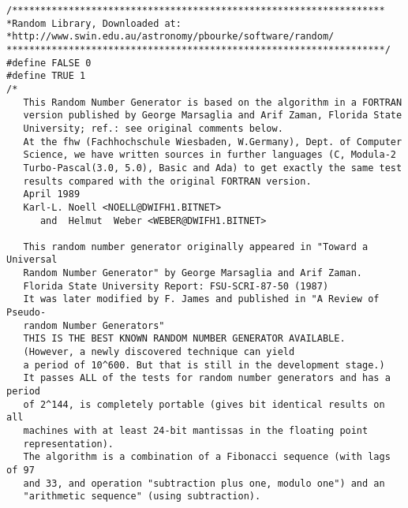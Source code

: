 \noindent
  \begin{lstlisting}[style=C]
/******************************************************************
*Random Library, Downloaded at:
*http://www.swin.edu.au/astronomy/pbourke/software/random/
*******************************************************************/
#define FALSE 0
#define TRUE 1
/*
   This Random Number Generator is based on the algorithm in a FORTRAN
   version published by George Marsaglia and Arif Zaman, Florida State
   University; ref.: see original comments below.
   At the fhw (Fachhochschule Wiesbaden, W.Germany), Dept. of Computer
   Science, we have written sources in further languages (C, Modula-2
   Turbo-Pascal(3.0, 5.0), Basic and Ada) to get exactly the same test
   results compared with the original FORTRAN version.
   April 1989
   Karl-L. Noell <NOELL@DWIFH1.BITNET>
      and  Helmut  Weber <WEBER@DWIFH1.BITNET>

   This random number generator originally appeared in "Toward a Universal
   Random Number Generator" by George Marsaglia and Arif Zaman.
   Florida State University Report: FSU-SCRI-87-50 (1987)
   It was later modified by F. James and published in "A Review of Pseudo-
   random Number Generators"
   THIS IS THE BEST KNOWN RANDOM NUMBER GENERATOR AVAILABLE.
   (However, a newly discovered technique can yield
   a period of 10^600. But that is still in the development stage.)
   It passes ALL of the tests for random number generators and has a period
   of 2^144, is completely portable (gives bit identical results on all
   machines with at least 24-bit mantissas in the floating point
   representation).
   The algorithm is a combination of a Fibonacci sequence (with lags of 97
   and 33, and operation "subtraction plus one, modulo one") and an
   "arithmetic sequence" (using subtraction).


\end{lstlisting}
